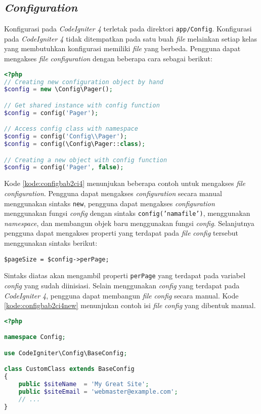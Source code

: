 \subsection{\textit{Configuration}}
Konfigurasi pada \textit{CodeIgniter 4} terletak pada direktori \texttt{app/Config}. Konfigurasi pada \textit{CodeIgniter 4} tidak ditempatkan pada satu buah \textit{file} melainkan setiap kelas yang membutuhkan konfigurasi memiliki \textit{file} yang berbeda. Pengguna dapat mengakses \textit{file} \textit{configuration} dengan beberapa cara sebagai berikut:
\begin{lstlisting}[language=PHP, caption=Contoh mengakses \textit{file} \textit{configuration}. ,label=kode:configbab2ci4]
<?php
// Creating new configuration object by hand
$config = new \Config\Pager();

// Get shared instance with config function
$config = config('Pager');

// Access config class with namespace
$config = config('Config\\Pager');
$config = config(\Config\Pager::class);

// Creating a new object with config function
$config = config('Pager', false);
\end{lstlisting}
Kode \ref{kode:configbab2ci4} menunjukan beberapa contoh untuk mengakses \textit{file} \textit{configuration}. Pengguna dapat mengakses \textit{configuration} secara manual menggunakan sintaks \texttt{new}, pengguna dapat mengakses \textit{configuration} menggunakan fungsi \textit{config} dengan sintaks \texttt{config('namafile')}, menggunakan \textit{namespace}, dan membangun objek baru menggunakan fungsi \textit{config}. Selanjutnya pengguna dapat mengakses properti yang terdapat pada \textit{file} \textit{config} tersebut menggunakan sintaks berikut:
\begin{center}
	\verb|$pageSize = $config->perPage;|
\end{center}
Sintaks diatas akan mengambil properti \texttt{perPage} yang terdapat pada variabel \textit{config} yang sudah diinisiasi. Selain menggunakan \textit{config} yang terdapat pada \textit{CodeIgniter 4}, pengguna dapat membangun \textit{file} \textit{config} secara manual. Kode \ref{kode:configbab2ci4new} menunjukan contoh isi \textit{file} \textit{config} yang dibentuk manual.
\begin{lstlisting}[language=PHP, caption=Contoh pembentukan \textit{file} \textit{configuration}. ,label=kode:configbab2ci4new]
<?php

namespace Config;

use CodeIgniter\Config\BaseConfig;

class CustomClass extends BaseConfig
{
    public $siteName  = 'My Great Site';
    public $siteEmail = 'webmaster@example.com';
    // ...
}
\end{lstlisting}
